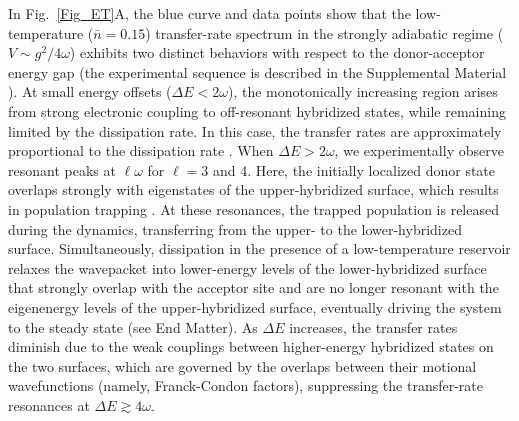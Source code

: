 \documentclass[
reprint,
superscriptaddress,

amsmath,amssymb,
aps,
prl,

floatfix,
]{revtex4-2}
\begin{document}
In Fig.~\ref{Fig_ET}A, the blue curve and data points show that the low-temperature ($\bar{n}=0.15$) transfer-rate spectrum in the strongly adiabatic regime ($V \sim g^2/4\omega$) exhibits two distinct behaviors with respect to the donor-acceptor energy gap (the experimental sequence is described in the Supplemental Material \cite{so2025fT_supp}). At small energy offsets ($\Delta E < 2\omega$), the monotonically increasing region arises from strong electronic coupling to off-resonant hybridized states, while remaining limited by the dissipation rate. In this case, the transfer rates are approximately proportional to the dissipation rate \cite{schlawin2021electrontransfer,so2024electrontransfer}. When $\Delta E > 2\omega$, we experimentally observe resonant peaks at $\ell\omega$ for $\ell=3$ and 4. Here, the initially localized donor state overlaps strongly with eigenstates of the upper-hybridized surface, which results in population trapping \cite{schlawin2021electrontransfer,so2024electrontransfer,so2025multimode}. At these resonances, the trapped population is released during the dynamics, transferring from the upper- to the lower-hybridized surface. Simultaneously, dissipation in the presence of a low-temperature reservoir relaxes the wavepacket into lower-energy levels of the lower-hybridized surface that strongly overlap with the acceptor site and are no longer resonant with the eigenenergy levels of the upper-hybridized surface, eventually driving the system to the steady state (see End Matter). As $\Delta E$ increases, the transfer rates diminish due to the weak couplings between higher-energy hybridized states on the two surfaces, which are governed by the overlaps between their motional wavefunctions (namely, Franck-Condon factors), suppressing the transfer-rate resonances at $\Delta E \gtrsim 4\omega$.
\end{document}
